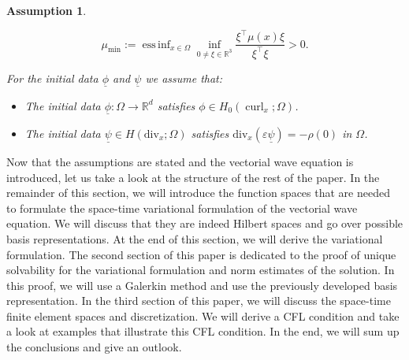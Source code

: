 \documentclass[a4paper,11pt]{article}
\newtheorem{assumption}[theorem]{Assumption}
\newcommand{\R}{\mathbb R}
\newcommand{\cu}{\operatorname{curl}}
\DeclareMathOperator*{\essinf}{ess\,inf}
\renewcommand{\vec}[1]{\underline{#1}}
\begin{document}
\begin{assumption}
\begin{itemize}
		\begin{equation*}
			\mu_{\min} := \essinf_{x\in \Omega} \inf_{0 \ne \xi\in \R^3} \frac{\xi^\top \mu(x) \xi}{\xi^\top\xi} > 0.
		\end{equation*}
	\end{itemize}
	For the initial data $\vec \phi$ and $\vec \psi$ we assume that:
	\begin{itemize}
		\item The initial data $\vec \phi:\Omega \to \R^d$ satisfies $\phi \in H_0(\cu_x;\Omega)$.
		\item The initial data $ \vec \psi \in H(\mathrm{div}_x;\Omega)$ satisfies $\mathrm{div}_x (\varepsilon \vec \psi)=-\rho(0)$ in $\Omega$. 
	\end{itemize}
\end{assumption}
Now that the assumptions are stated and the vectorial wave equation is introduced, let us take a look at the structure of the rest of the paper. 
In the remainder of this section, we will introduce the  function spaces that are needed to formulate the space-time variational formulation of the vectorial wave equation. We will discuss that they are indeed Hilbert spaces and go over possible basis representations. At the end of this section, we will derive the variational formulation. The second section of this paper is dedicated to the proof of unique solvability for the variational formulation and norm estimates of the solution. In this proof, we will use a Galerkin method and use the previously developed basis representation. In the third section of this paper, we will discuss the space-time finite element spaces and discretization. We will derive a CFL condition and take a look at examples that   illustrate this CFL condition. In the end, we will sum up the conclusions and give an outlook.

\end{document}
